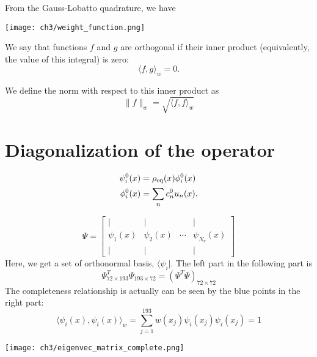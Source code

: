 \begin{definition}
From the  Gauss-Lobatto quadrature, we have
\begin{center}
        \texttt{[image: ch3/weight\_function.png]}   
\end{center}
\end{definition}

\begin{definition}[Orthogonal]
We say that functions $f$ and $g$ are orthogonal if their inner product (equivalently, the value of this integral) is zero:
\begin{equation}
        \langle f,g\rangle _{w}=0.
\end{equation}
\end{definition}

\begin{definition}[Norm]
We define the norm with respect to this inner product as
\begin{equation}
        \|f\|_w = \sqrt{\langle f, f\rangle_w}
\end{equation}
\end{definition}

\section{Diagonalization of the operator}
\begin{definition}
\begin{align}
        \psi^0_i(x) &= \rho_{\rm eq}(x) \phi^0_i(x) \\
        \phi^0_i(x) &= \sum_n c^0_n u_n(x).
\end{align}
\label{basisfunctions}
\end{definition}

\begin{definition}
\begin{equation}
\Psi=
\begin{bmatrix}
\vert & \vert &  & \vert \\
\psi_1(x) & \psi_2(x) & \cdots & \psi_{N_v}(x) \\
\vert & \vert &  & \vert 
\end{bmatrix}
\end{equation}
\label{eigenvectormatrix}
Here, we get a set of orthonormal basis, $\langle \psi_i |$. The left part in the following part is 
\begin{equation}
        \Psi^T_{72\times 193}\Psi_{193 \times 72} = (\Psi^T\Psi)_{72 \times 72}
\end{equation}
The completeness relationship is actually can be seen by the blue points in the right part:
\begin{equation}
        \langle \psi_i(x),\psi_i(x)\rangle _{w} = \sum_{j=1}^{193}w(x_j)\psi_i(x_j)\psi_i(x_j)  = 1
\end{equation}
\begin{center}
        \texttt{[image: ch3/eigenvec\_matrix\_complete.png]}   
\end{center}
\end{definition}

